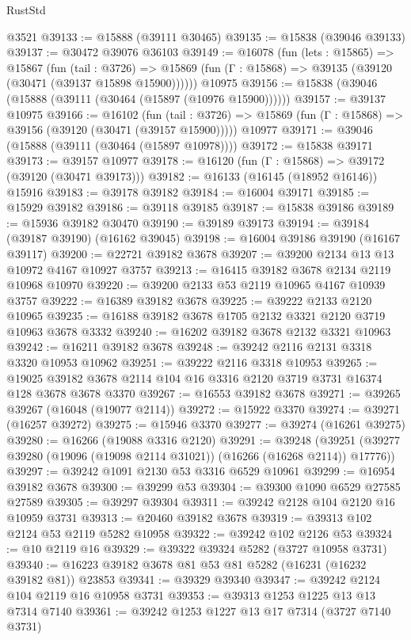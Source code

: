 \begin{lexlean}{RustStd}
\begin{coremodule}
    @3521
@39133 := @15888 (@39111 @30465)
@39135 := @15838 (@39046 @39133)
@39137 := @30472 @39076 @36103
@39149 := @16078
    (fun (lets : @15865) =>
    @15867
      (fun (tail : @3726) =>
      @15869 (fun (Γ : @15868) => @39135 (@39120 (@30471 (@39137 @15898 @15900))))))
    @10975
@39156 := @15838 (@39046 (@15888 (@39111 (@30464 (@15897 (@10976 @15900))))))
@39157 := @39137 @10975
@39166 := @16102
    (fun (tail : @3726) => @15869 (fun (Γ : @15868) => @39156 (@39120 (@30471 (@39157 @15900)))))
    @10977
@39171 := @39046 (@15888 (@39111 (@30464 (@15897 @10978))))
@39172 := @15838 @39171
@39173 := @39157 @10977
@39178 := @16120 (fun (Γ : @15868) => @39172 (@39120 (@30471 @39173)))
@39182 := @16133 (@16145 (@18952 @16146)) @15916
@39183 := @39178 @39182
@39184 := @16004 @39171
@39185 := @15929 @39182
@39186 := @39118 @39185
@39187 := @15838 @39186
@39189 := @15936 @39182 @30470
@39190 := @39189 @39173
@39194 := @39184 (@39187 @39190) (@16162 @39045)
@39198 := @16004 @39186 @39190 (@16167 @39117)
@39200 := @22721 @39182 @3678
@39207 := @39200 @2134 @13 @13 @10972 @4167 @10927 @3757
@39213 := @16415 @39182 @3678 @2134 @2119 @10968 @10970
@39220 := @39200 @2133 @53 @2119 @10965 @4167 @10939 @3757
@39222 := @16389 @39182 @3678
@39225 := @39222 @2133 @2120 @10965
@39235 := @16188 @39182 @3678 @1705 @2132 @3321 @2120 @3719 @10963 @3678 @3332
@39240 := @16202 @39182 @3678 @2132 @3321 @10963
@39242 := @16211 @39182 @3678
@39248 := @39242 @2116 @2131 @3318 @3320 @10953 @10962
@39251 := @39222 @2116 @3318 @10953
@39265 := @19025 @39182 @3678 @2114 @104 @16 @3316 @2120 @3719 @3731 @16374 @128 @3678 @3678 @3370
@39267 := @16553 @39182 @3678
@39271 := @39265 @39267 (@16048 (@19077 @2114))
@39272 := @15922 @3370
@39274 := @39271 (@16257 @39272)
@39275 := @15946 @3370
@39277 := @39274 (@16261 @39275)
@39280 := @16266 (@19088 @3316 @2120)
@39291 := @39248
    (@39251 (@39277 @39280 (@19096 (@19098 @2114 @31021)) (@16266 (@16268 @2114)) @17776))
@39297 := @39242 @1091 @2130 @53 @3316 @6529 @10961
@39299 := @16954 @39182 @3678
@39300 := @39299 @53
@39304 := @39300 @1090 @6529 @27585 @27589
@39305 := @39297 @39304
@39311 := @39242 @2128 @104 @2120 @16 @10959 @3731
@39313 := @20460 @39182 @3678
@39319 := @39313 @102 @2124 @53 @2119 @5282 @10958
@39322 := @39242 @102 @2126 @53
@39324 := @10 @2119 @16
@39329 := @39322 @39324 @5282 (@3727 @10958 @3731)
@39340 := @16223 @39182 @3678 @81 @53 @81 @5282 (@16231 (@16232 @39182 @81)) @23853
@39341 := @39329 @39340
@39347 := @39242 @2124 @104 @2119 @16 @10958 @3731
@39353 := @39313 @1253 @1225 @13 @13 @7314 @7140
@39361 := @39242 @1253 @1227 @13 @17 @7314 (@3727 @7140 @3731)

\end{coremodule}
\end{lexlean}
